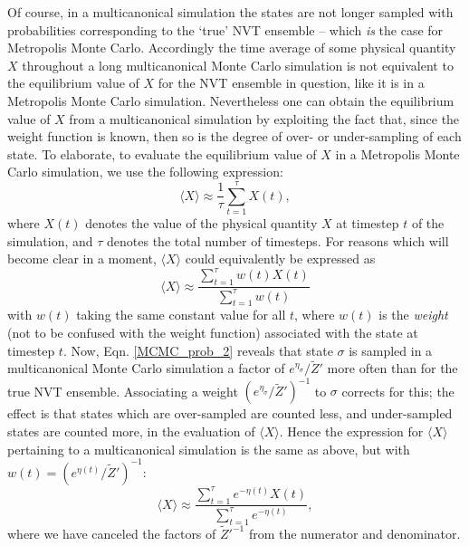 \documentclass{report}
\begin{document}
Of course, in a multicanonical simulation the states are not longer sampled with probabilities corresponding to the `true' NVT ensemble -- 
which \emph{is} the case for Metropolis Monte Carlo. Accordingly the time average of some physical quantity $X$ throughout a long multicanonical 
Monte Carlo simulation is not equivalent to the equilibrium value of $X$ for the NVT ensemble in question, like it is in a Metropolis Monte Carlo
simulation. Nevertheless one can obtain the equilibrium value of $X$ from a multicanonical simulation by exploiting the fact that, since the 
weight function is known, then so is the degree of over- or under-sampling of each state. To elaborate, to evaluate the equilibrium value of 
$X$ in a Metropolis Monte Carlo simulation, we use the following expression:
\begin{equation}
\langle X\rangle\approx\frac{1}{\tau}\sum_{t=1}^{\tau}X(t),
\end{equation}
where $X(t)$ denotes the value of the physical quantity $X$ at timestep $t$ of the simulation, and $\tau$ denotes the total number of timesteps.
For reasons which will become clear in a moment, $\langle X\rangle$ could equivalently be expressed as
\begin{equation}
\langle X\rangle\approx\frac{\displaystyle\sum_{t=1}^{\tau}w(t)X(t)}{\displaystyle\sum_{t=1}^{\tau}w(t)}
\end{equation}
with $w(t)$ taking the same constant value for all $t$, where $w(t)$ is the \emph{weight} (not to be confused with the weight function) associated 
with the state at timestep $t$.
Now, Eqn. \eqref{MCMC_prob_2} reveals that state $\sigma$ is sampled in a multicanonical Monte Carlo simulation a factor of
$e^{\eta_{\sigma}}/\tilde{Z}'$ more often than for the true NVT ensemble. Associating a weight $(e^{\eta_{\sigma}}/\tilde{Z}')^{-1}$ to $\sigma$ corrects for
this; the effect is that states which are over-sampled are counted less, and under-sampled states are counted more, in the evaluation of $\langle X\rangle$.
Hence the expression for $\langle X\rangle$ pertaining to a multicanonical simulation is the same as above, but with $w(t)=(e^{\eta(t)}/\tilde{Z}')^{-1}$:
\begin{equation}\label{equilX_MCMC}
\langle X\rangle\approx\frac{\displaystyle\sum_{t=1}^{\tau}e^{-\eta(t)}X(t)}{\displaystyle\sum_{t=1}^{\tau}e^{-\eta(t)}},
\end{equation}
where we have canceled the factors of $\tilde{Z}'^{-1}$ from the numerator and denominator.
\end{document}

